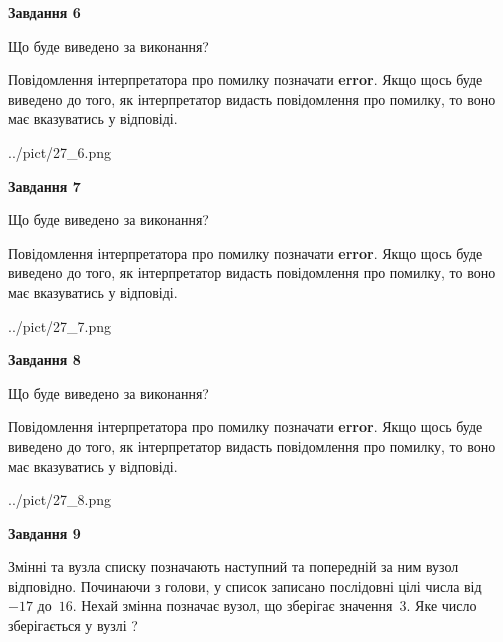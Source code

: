 \documentclass[12pt, ukrainian]{article}
\begin{document}
{\begin {large}
{\begin {center}\textbf{Завдання 6}\end {center}}\par
Що буде виведено за виконання?

Повідомлення інтерпретатора про помилку позначати \textbf{error}.
Якщо щось буде виведено до того, як інтерпретатор видасть повідомлення про помилку, 
то воно має вказуватись у відповіді. \par


\begin{center}
	{../pict/27_6.png}
\end{center}
\newpage

{\begin {center}\textbf{Завдання 7}\end {center}}\par
Що буде виведено за виконання?

Повідомлення інтерпретатора про помилку позначати \textbf{error}.
Якщо щось буде виведено до того, як інтерпретатор видасть повідомлення про помилку, 
то воно має вказуватись у відповіді. \par


\begin{center}
	{../pict/27_7.png}
\end{center}
\newpage

{\begin {center}\textbf{Завдання 8}\end {center}}\par
Що буде виведено за виконання?

Повідомлення інтерпретатора про помилку позначати \textbf{error}.
Якщо щось буде виведено до того, як інтерпретатор видасть повідомлення про помилку, 
то воно має вказуватись у відповіді. \par


\begin{center}
	{../pict/27_8.png}
\end{center}
\newpage

{\begin {center}\textbf{Завдання 9}\end {center}}\par
Змінні  та  вузла списку позначають наступний та попередній за ним вузол відповідно. Починаючи з голови, у список записано послідовні цілі числа від~$-17$ до~$16$. Нехай змінна  позначає вузол, що зберігає значення~$3$.
Яке число зберігається у вузлі  ?\par
\newpage


\end{large}}
\end{document}
